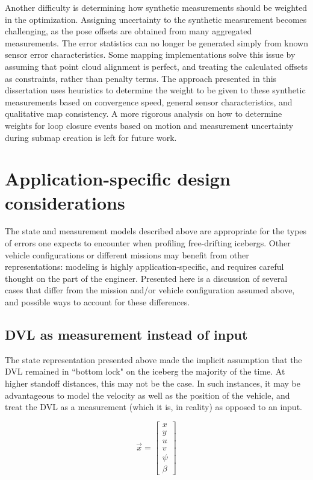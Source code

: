 Another difficulty is determining how synthetic measurements should be weighted in the optimization. Assigning uncertainty to the synthetic measurement becomes challenging, as the pose offsets are obtained from many aggregated measurements. The error statistics can no longer be generated simply from known sensor error characteristics. Some mapping implementations solve this issue by assuming that point cloud alignment is perfect, and treating the calculated offsets as constraints, rather than penalty terms. The approach presented in this dissertation uses heuristics to determine the weight to be given to these synthetic measurements based on convergence speed, general sensor characteristics, and qualitative map consistency. A more rigorous analysis on how to determine weights for loop closure events based on motion and measurement uncertainty during submap creation is left for future work.






\section{Application-specific design considerations}

The state and measurement models described above are appropriate for the types of errors one expects to encounter when profiling free-drifting icebergs. Other vehicle configurations or different missions may benefit from other representations: modeling is highly application-specific, and requires careful thought on the part of the engineer. Presented here is a discussion of several cases that differ from the mission and/or vehicle configuration assumed above, and possible ways to account for these differences.

\subsection{DVL as measurement instead of input}
\label{sec.VelocityState}
The state representation presented above made the implicit assumption that the DVL remained in ``bottom lock" on the iceberg the majority of the time. At higher standoff distances, this may not be the case. In such instances, it may be advantageous to model the velocity as well as the position of the vehicle, and treat the DVL as a measurement (which it is, in reality) as opposed to an input.

\begin{equation}
\label{eq.altState}
\vec{x}= \left[\begin{array}{c}
                     x \\ y \\ u \\ v \\ \psi \\ \beta 
                     \end{array}\right]
\end{equation}

